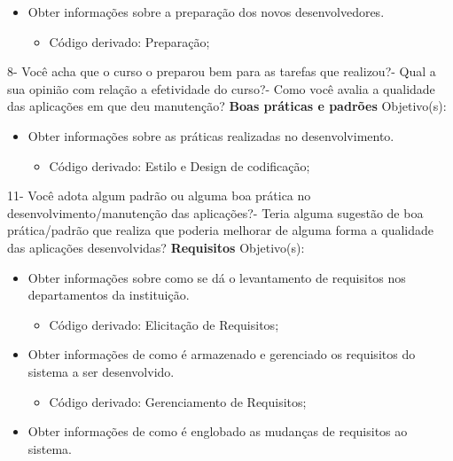 \begin{apendicesenv}
\begin{itemize}
	\item Obter informações sobre a preparação dos novos desenvolvedores.
	\begin{itemize}
		\item Código derivado: Preparação;
	\end{itemize}
\end{itemize}
8- Você acha que o curso o preparou bem para as tarefas que realizou?- Qual a sua opinião com relação a efetividade do curso?- Como você avalia a qualidade das aplicações em que deu manutenção?\newline
\newline
\textbf{Boas práticas e padrões}\newline\newline
Objetivo(s):
\begin{itemize}
	\item Obter informações sobre as práticas realizadas no desenvolvimento.
	\begin{itemize}
		\item Código derivado: Estilo e Design de codificação;
	\end{itemize}
\end{itemize}
11- Você adota algum padrão ou alguma boa prática no desenvolvimento/manutenção das aplicações?- Teria alguma sugestão de boa prática/padrão que realiza que poderia melhorar de alguma forma a qualidade das aplicações desenvolvidas?\newline
\newline
\textbf{Requisitos}\newline\newline
Objetivo(s):
\begin{itemize}
	\item Obter informações sobre como se dá o levantamento de requisitos nos departamentos da instituição.
	\begin{itemize}
		\item Código derivado: Elicitação de Requisitos;
	\end{itemize}
	\item Obter informações de como é armazenado e gerenciado os requisitos do sistema a ser desenvolvido.
	\begin{itemize}
		\item Código derivado: Gerenciamento de Requisitos;
	\end{itemize}
	\item Obter informações de como é englobado as mudanças de requisitos ao sistema.

\end{itemize}
\end{apendicesenv}
